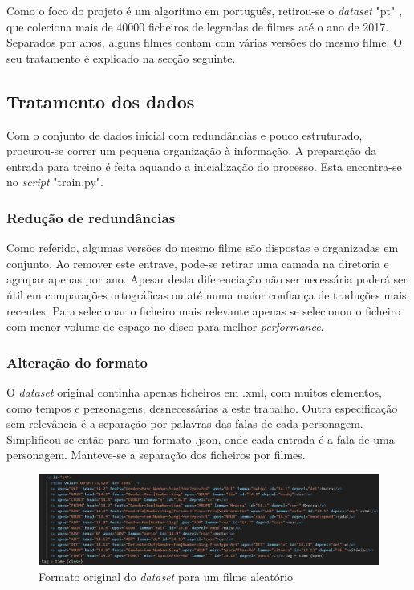 \documentclass{article}
\begin{document}
Como o foco do projeto é um algoritmo em português, retirou-se o \textit{dataset} "pt" \cite{lison-tiedemann-2016-opensubtitles2016}, que coleciona mais de 40000 ficheiros de legendas de filmes até o ano de 2017. Separados por anos, alguns filmes contam com várias versões do mesmo filme. O seu tratamento é explicado na secção seguinte. 

\subsection{Tratamento dos dados}
Com o conjunto de dados inicial com redundâncias e pouco estruturado, procurou-se correr um pequena organização à informação. A preparação da entrada para treino é feita aquando a inicialização do processo. Esta encontra-se no \textit{script} "train.py".

\subsubsection{Redução de redundâncias}
Como referido, algumas versões do mesmo filme são dispostas e organizadas em conjunto. Ao remover este entrave, pode-se retirar uma camada na diretoria e agrupar apenas por ano. Apesar desta diferenciação não ser necessária poderá ser útil em comparações ortográficas ou até numa maior confiança de traduções mais recentes. Para selecionar o ficheiro mais relevante apenas se selecionou o ficheiro com menor volume de espaço no disco para melhor \textit{performance}.

\subsubsection{Alteração do formato}
O \textit{dataset} original continha apenas ficheiros em .xml, com muitos elementos, como tempos e personagens, desnecessárias a este trabalho. Outra especificação sem relevância é a separação por palavras das falas de cada personagem. Simplificou-se então para um formato .json, onde cada entrada é a fala de uma personagem. Manteve-se a separação dos ficheiros por filmes.

\begin{figure}
	\centering
    \includegraphics[scale=0.3]{images/xml.png}
    \caption{Formato original do \textit{dataset} para um filme aleatório}
    \label{xmlimg}
\end{figure}
\end{document}
